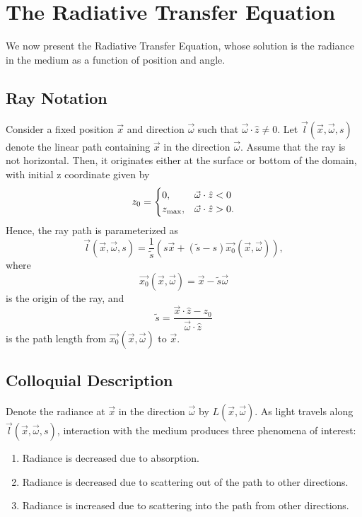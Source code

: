 \section{The Radiative Transfer Equation}
We now present the Radiative Transfer Equation, whose solution is the radiance in the medium as a function of position and angle.

\subsection{Ray Notation}
Consider a fixed position $\vec{x}$ and direction $\vec{\omega}$ such that
$\vec{\omega} \cdot \hat{z} \neq 0$.
Let $\vec{l}(\vec{x}, \vec{\omega}, s)$ denote the linear path containing $\vec{x}$ in the direction $\vec{\omega}$.
Assume that the ray is not horizontal.
Then, it originates either at the surface or bottom of the domain, with initial z coordinate given by
\begin{equation*}
  z_0 =
   \begin{cases}
    0, & \vec{\omega} \cdot \hat{z} < 0 \\
    {z_{\max}}, & \vec{\omega} \cdot \hat{z} > 0.
  \end{cases}
\end{equation*}
Hence, the ray path is parameterized as
\begin{equation}
  \vec{l}(\vec{x}, \vec{\omega}, s) = \frac{1}{\tilde{s}} (s\vec{x} + (\tilde{s} - s)\vec{x_0}(\vec{x}, \vec{\omega})),
  \label{eqn:ray_path}
\end{equation}
where
\begin{equation*}
  \vec{x_0}(\vec{x}, \vec{\omega}) = \vec{x} - \tilde{s} \vec{\omega}
\end{equation*}
is the origin of the ray, and 
\begin{equation*}
  \tilde{s} = \frac{\vec{x} \cdot \hat{z} - z_0}{\vec{\omega} \cdot \hat{z}}
\end{equation*}
is the path length from $\vec{x_0}(\vec{x}, \vec{\omega})$ to $\vec{x}$.

\subsection{Colloquial Description}
Denote the radiance at $\vec{x}$ in the direction $\vec{\omega}$ by $L(\vec{x}, \vec{\omega})$.
As light travels along $\vec{l}(\vec{x}, \vec{\omega}, s)$, interaction with the
medium produces three phenomena of interest:
\begin{enumerate}
  \item Radiance is decreased due to absorption.
  \item Radiance is decreased due to scattering out of the path to other
    directions.
  \item Radiance is increased due to scattering into the path from other
      directions.
\end{enumerate}

